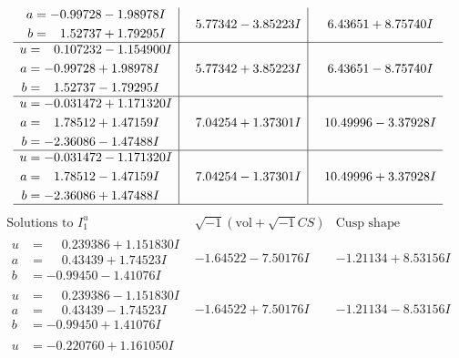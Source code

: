 \documentclass[1p]{elsarticle_modified}
\theoremstyle{definition}
\newcommand{\I}{\sqrt{-1}}
\begin{document}
$$\begin{array}{c|c|c}
\begin{aligned}
a &= -0.99728 - 1.98978 I \\
b &= \phantom{-}1.52737 + 1.79295 I\end{aligned}
 & \phantom{-}5.77342 - 3.85223 I & \phantom{-}6.43651 + 8.75740 I \\ \hline\begin{aligned}
u &= \phantom{-}0.107232 - 1.154900 I \\
a &= -0.99728 + 1.98978 I \\
b &= \phantom{-}1.52737 - 1.79295 I\end{aligned}
 & \phantom{-}5.77342 + 3.85223 I & \phantom{-}6.43651 - 8.75740 I \\ \hline\begin{aligned}
u &= -0.031472 + 1.171320 I \\
a &= \phantom{-}1.78512 + 1.47159 I \\
b &= -2.36086 - 1.47488 I\end{aligned}
 & \phantom{-}7.04254 + 1.37301 I & \phantom{-}10.49996 - 3.37928 I \\ \hline\begin{aligned}
u &= -0.031472 - 1.171320 I \\
a &= \phantom{-}1.78512 - 1.47159 I \\
b &= -2.36086 + 1.47488 I\end{aligned}
 & \phantom{-}7.04254 - 1.37301 I & \phantom{-}10.49996 + 3.37928 I\\
 \hline 
 \end{array}$$\newpage$$\begin{array}{c|c|c}  
\text{Solutions to }I^u_{1}& \I (\text{vol} + \sqrt{-1}CS) & \text{Cusp shape}\\
 \hline 
\begin{aligned}
u &= \phantom{-}0.239386 + 1.151830 I \\
a &= \phantom{-}0.43439 + 1.74523 I \\
b &= -0.99450 - 1.41076 I\end{aligned}
 & -1.64522 - 7.50176 I & -1.21134 + 8.53156 I \\ \hline\begin{aligned}
u &= \phantom{-}0.239386 - 1.151830 I \\
a &= \phantom{-}0.43439 - 1.74523 I \\
b &= -0.99450 + 1.41076 I\end{aligned}
 & -1.64522 + 7.50176 I & -1.21134 - 8.53156 I \\ \hline\begin{aligned}
u &= -0.220760 + 1.161050 I \\

\end{aligned}
\end{array}$$
\end{document}
